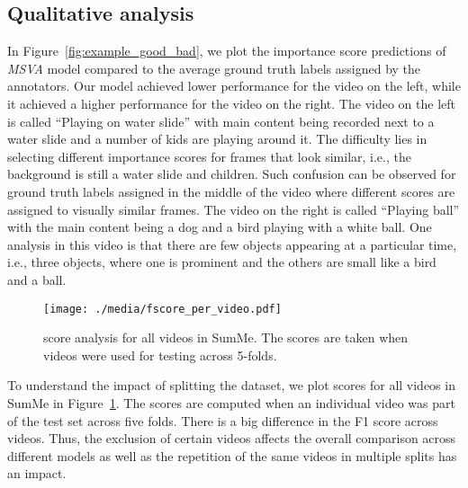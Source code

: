 \documentclass{article}
\begin{document}
\subsection{Qualitative analysis}



In Figure~\ref{fig:example_good_bad}, we plot the importance score predictions of \textit{MSVA} model compared to the average ground truth labels assigned by the annotators. Our model achieved lower performance for the video on the left, while it achieved a higher performance for the video on the right. The video on the left is called ``Playing on water slide'' with main content being recorded next to a water slide and a number of kids are playing around it. The difficulty lies in selecting different importance scores for frames that look similar, i.e., the background is still a water slide and children. Such confusion can be observed for ground truth labels assigned in the middle of the video where different scores are assigned to visually similar frames. 
The video on the right is called ``Playing ball'' with the main content being a dog and a bird playing with a white ball. One analysis in this video is that there are few objects appearing at a particular time, i.e., three objects, where one is prominent and the others are small like a bird and a ball.


\begin{figure}[ht]
\begin{center}
\texttt{[image: ./media/fscore\_per\_video.pdf]}
\caption{ score analysis for all videos in SumMe. The scores are taken when videos were used for testing across 5-folds.}
\label{fig:video_wise-analysis}
\end{center}
\end{figure}

To understand the impact of splitting the dataset, we plot  scores for all videos in SumMe in Figure~\ref{fig:video_wise-analysis}. The scores are computed when an individual video was part of the test set across five folds. There is a big difference in the F1 score across videos. Thus, the exclusion of certain videos affects the overall comparison across different models as well as the repetition of the same videos in multiple splits has an impact. 
\end{document}
